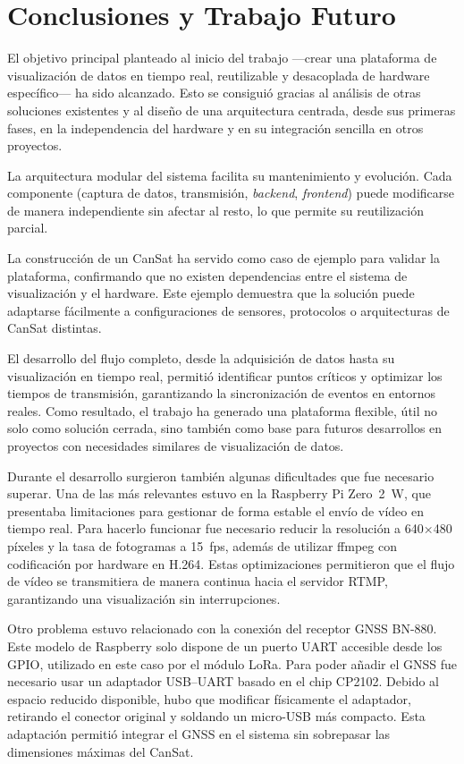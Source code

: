 \chapter{Conclusiones y Trabajo Futuro}
\label{cap:conclusiones}

El objetivo principal planteado al inicio del trabajo —crear una plataforma de 
visualización de datos en tiempo real, reutilizable y desacoplada de hardware 
específico— ha sido alcanzado. Esto se consiguió gracias al análisis de otras 
soluciones existentes y al diseño de una arquitectura centrada, desde sus primeras 
fases, en la independencia del hardware y en su integración sencilla en otros proyectos.

La arquitectura modular del sistema facilita su mantenimiento y evolución. Cada 
componente (captura de datos, transmisión, \emph{backend}, \emph{frontend}) puede 
modificarse de manera independiente sin afectar al resto, lo que permite su 
reutilización parcial.

La construcción de un CanSat ha servido como caso de ejemplo para validar la 
plataforma, confirmando que no existen dependencias entre el sistema de visualización 
y el hardware. Este ejemplo demuestra que la solución puede adaptarse fácilmente a 
configuraciones de sensores, protocolos o arquitecturas de CanSat distintas.

El desarrollo del flujo completo, desde la adquisición de datos hasta su visualización 
en tiempo real, permitió identificar puntos críticos y optimizar los tiempos de 
transmisión, garantizando la sincronización de eventos en entornos reales. Como 
resultado, el trabajo ha generado una plataforma flexible, útil no solo como solución 
cerrada, sino también como base para futuros desarrollos en proyectos con necesidades 
similares de visualización de datos.

Durante el desarrollo surgieron también algunas dificultades que fue necesario 
superar. Una de las más relevantes estuvo en la Raspberry Pi Zero~2~W, que presentaba 
limitaciones para gestionar de forma estable el envío de vídeo en tiempo real. Para 
hacerlo funcionar fue necesario reducir la resolución a 640×480 píxeles y la tasa de 
fotogramas a 15~fps, además de utilizar ffmpeg con codificación por hardware en 
H.264. Estas optimizaciones permitieron que el flujo de vídeo se transmitiera de manera 
continua hacia el servidor RTMP, garantizando una visualización sin interrupciones.

Otro problema estuvo relacionado con la conexión del receptor GNSS BN-880. Este modelo de Raspberry solo dispone de un puerto UART accesible desde los GPIO, utilizado en este caso  por el módulo LoRa. Para poder añadir el GNSS fue necesario usar un adaptador 
USB–UART basado en el chip CP2102. Debido al espacio reducido disponible, hubo que 
modificar físicamente el adaptador, retirando el conector original y soldando un 
micro-USB más compacto. Esta adaptación permitió integrar el GNSS en el sistema sin sobrepasar las dimensiones máximas del CanSat.

